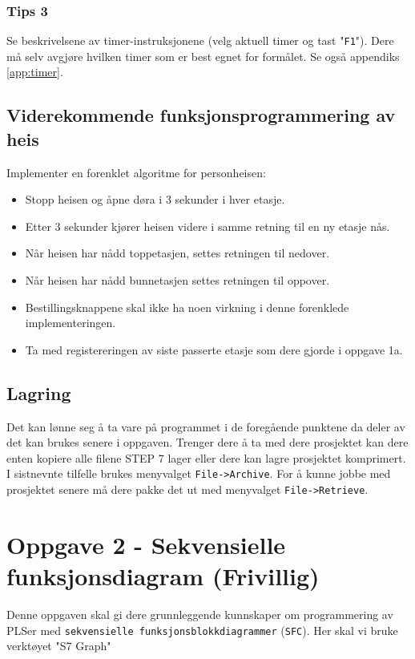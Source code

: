 \subsubsection*{Tips 3}
Se beskrivelsene av timer-instruksjonene (velg aktuell timer og tast "\verb|F1|"). Dere må selv avgjøre
hvilken timer som er best egnet for formålet. Se også appendiks \ref{app:timer}.

\subsection{Viderekommende funksjonsprogrammering av heis}

Implementer en forenklet algoritme for personheisen:

\begin{itemize}
    \item Stopp heisen og åpne døra i 3 sekunder i hver etasje.
    \item Etter 3 sekunder kjører heisen videre i samme retning til en ny etasje nås.
    \item Når heisen har nådd toppetasjen, settes retningen til nedover. 
    \item Når heisen har nådd bunnetasjen settes retningen til oppover. 
    \item Bestillingsknappene skal ikke ha noen virkning i denne forenklede implementeringen.
    \item Ta med registereringen av siste passerte etasje som dere gjorde i oppgave 1a.
\end{itemize}

\subsection*{\color{RWTHrot100}Lagring}
Det kan lønne seg å ta vare på programmet i de foregående punktene da deler av det kan brukes
senere i oppgaven. Trenger dere å ta med dere prosjektet kan dere enten kopiere alle filene
STEP 7 lager eller dere kan lagre prosjektet komprimert. I sistnevnte tilfelle brukes menyvalget \verb|File->Archive|. For å kunne jobbe med prosjektet senere må dere pakke det ut med menyvalget
\verb|File->Retrieve|.


\section{Oppgave 2 - Sekvensielle funksjonsdiagram (Frivillig)}\label{sec:4-oppgave}

Denne oppgaven skal gi dere grunnleggende kunnskaper om programmering av PLSer med \verb|sekvensielle funksjonsblokkdiagrammer| (\verb|SFC|). Her skal vi bruke verktøyet "S7 Graph"

